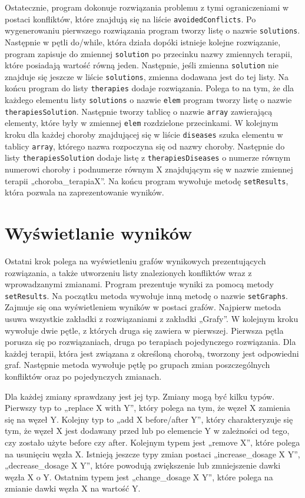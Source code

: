 Ostatecznie, program dokonuje rozwiązania problemu z tymi ograniczeniami w postaci konfliktów, które znajdują się na liście \texttt{avoidedConflicts}. Po wygenerowaniu pierwszego rozwiązania program tworzy listę o nazwie \texttt{solutions}. Następnie w pętli do/while, która działa dopóki istnieje kolejne rozwiązanie, program zapisuje do zmiennej \texttt{solution} po przecinku nazwy zmiennych terapii, które posiadają wartość równą jeden. Następnie, jeśli zmienna \texttt{solution} nie znajduje się jeszcze w liście \texttt{solutions}, zmienna dodawana jest do tej listy. Na końcu program do listy \texttt{therapies} dodaje rozwiązania. Polega to na tym, że dla każdego elementu listy \texttt{solutions} o nazwie \texttt{elem} program tworzy listę o nazwie \texttt{therapiesSolution}. Następnie tworzy tablicę o nazwie \texttt{array} zawierającą elementy, które były w zmiennej \texttt{elem} rozdzielone przecinkami. W kolejnym kroku dla każdej choroby znajdującej się w liście \texttt{diseases} szuka elementu w tablicy \texttt{array}, którego nazwa rozpoczyna się od nazwy choroby. Następnie do listy \texttt{therapiesSolution} dodaje listę z \texttt{therapiesDiseases} o numerze równym numerowi choroby i podnumerze równym X znajdującym się w nazwie zmiennej terapii „choroba\_terapiaX”. Na końcu program wywołuje metodę \texttt{setResults}, która pozwala na zaprezentowanie wyników. 

\section{Wyświetlanie wyników}
Ostatni krok polega na wyświetleniu grafów wynikowych prezentujących rozwiązania, a także utworzeniu listy znalezionych konfliktów wraz z wprowadzanymi zmianami. Program prezentuje wyniki za pomocą metody \texttt{setResults}. Na początku metoda wywołuje inną metodę o nazwie \texttt{setGraphs}. Zajmuje się ona wyświetleniem wyników w postaci grafów. Najpierw metoda usuwa wszystkie zakładki z rozwiązaniami z zakładki „Grafy”. W kolejnym kroku wywołuje dwie pętle, z których druga się zawiera w pierwszej. Pierwsza pętla porusza się po rozwiązaniach, druga po terapiach pojedynczego rozwiązania. Dla każdej terapii, która jest związana z określoną chorobą, tworzony jest odpowiedni graf. Następnie metoda wywołuje pętlę po grupach zmian poszczególnych konfliktów oraz po pojedynczych zmianach. 

Dla każdej zmiany sprawdzany jest jej typ. Zmiany mogą być kilku typów. Pierwszy typ to „replace X with Y”, który polega na tym, że węzeł X zamienia się na węzeł Y. Kolejny typ to „add X before/after Y”, który charakteryzuje się tym, że węzeł X jest dodawany przed lub po elemencie Y w zależności od tego, czy zostało użyte before czy after. Kolejnym typem jest „remove X”, które polega na usunięciu węzła X. Istnieją jeszcze typy zmian postaci „increase\_dosage X Y”, „decrease\_dosage X Y”, które powodują zwiększenie lub zmniejszenie dawki węzła X o Y. Ostatnim typem jest „change\_dosage X Y”, które polega na zmianie dawki węzła X na wartość Y.  

